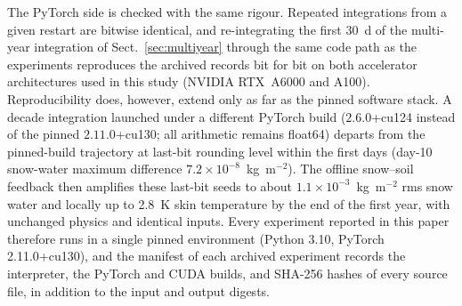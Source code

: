 The PyTorch side is checked with the same rigour. Repeated integrations from
a given restart are bitwise identical, and re-integrating the first 30~d of the
multi-year integration of Sect.~\ref{sec:multiyear} through the
same code path as the experiments reproduces the archived records bit for
bit on both accelerator architectures used in this study (NVIDIA
RTX~A6000 and A100). Reproducibility does, however, extend only as far as the pinned
software stack. A decade integration launched under a different PyTorch
build ($2.6.0$+cu124 instead of the pinned $2.11.0$+cu130; all arithmetic
remains float64) departs from the pinned-build trajectory at last-bit
rounding level within the first days (day-10 snow-water maximum difference
$7.2\times10^{-8}$~kg~m$^{-2}$). The offline snow--soil feedback then
amplifies these last-bit seeds to about $1.1\times10^{-3}$~kg~m$^{-2}$ rms
snow water and locally up to 2.8~K skin temperature by the end of the first
year, with unchanged physics and identical inputs. Every experiment
reported in this paper therefore runs in a single pinned environment
(Python 3.10, PyTorch 2.11.0+cu130), and the manifest of each archived
experiment records the interpreter, the PyTorch and CUDA builds, and
SHA-256 hashes of every source file, in addition to the input and output
digests.

